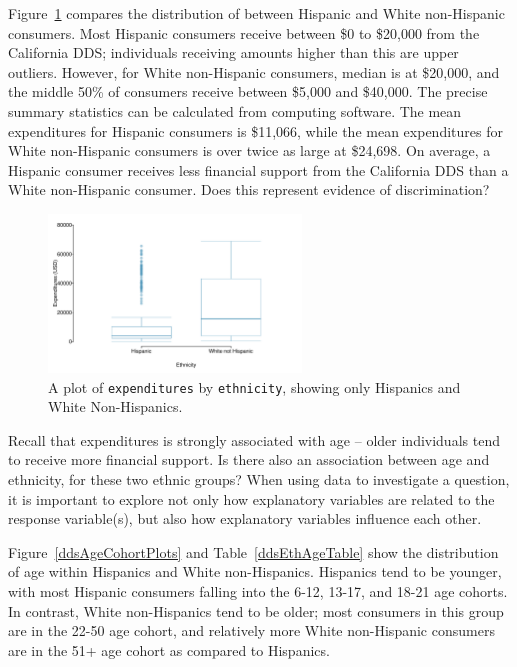 Figure~\ref{ddsExpHispWhite} compares the distribution of  between Hispanic and White non-Hispanic consumers. Most Hispanic consumers receive between \$0 to \$20,000 from the California DDS; individuals receiving amounts higher than this are upper outliers. However, for White non-Hispanic consumers, median  is at \$20,000, and the middle 50\% of consumers receive between \$5,000 and \$40,000. The precise summary statistics can be calculated from computing software. The mean expenditures for Hispanic consumers is \$11,066, while the mean expenditures for White non-Hispanic consumers is over twice as large at \$24,698. On average, a Hispanic consumer receives less financial support from the California DDS than a White non-Hispanic consumer. Does this represent evidence of discrimination?

\begin{figure}[h]
	\centering
	\includegraphics[width=0.6\textwidth]{ch_intro_to_data_oi_biostat/figures/ddsExpHispWhite/ddsExpHispWhite}
	\caption{A plot of \texttt{expenditures} by \texttt{ethnicity}, showing only Hispanics and White Non-Hispanics.}
	\label{ddsExpHispWhite}
\end{figure}

Recall that expenditures is strongly associated with age -- older individuals tend to receive more financial support. Is there also an association between age and ethnicity, for these two ethnic groups? When using data to investigate a question, it is important to explore not only how explanatory variables are related to the response variable(s), but also how explanatory variables influence each other. 

Figure~\ref{ddsAgeCohortPlots} and Table~\ref{ddsEthAgeTable} show the distribution of age within Hispanics and White non-Hispanics. Hispanics tend to be younger, with most Hispanic consumers falling into the 6-12, 13-17, and 18-21 age cohorts. In contrast, White non-Hispanics tend to be older; most consumers in this group are in the 22-50 age cohort, and relatively more White non-Hispanic consumers are in the 51+ age cohort as compared to Hispanics.

